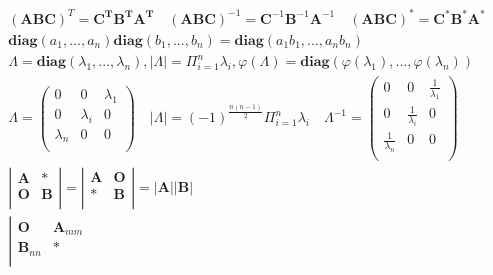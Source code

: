 \documentclass{article}
\begin{document}
\begin{align*}
    (\mathbf{A}\mathbf{B}\mathbf{C})^{T} = \mathbf{C}^{\mathbf{T}}\mathbf{B}^{\mathbf{T}}\mathbf{A}^{\mathbf{T}} \quad (\mathbf{A}\mathbf{B}\mathbf{C})^{-1} = \mathbf{C}^{-1}\mathbf{B}^{-1}\mathbf{A}^{-1} \quad (\mathbf{A}\mathbf{B}\mathbf{C})^{\mathbf{*}} = \mathbf{C}^{\mathbf{*}}\mathbf{B}^{\mathbf{*}}\mathbf{A}^{\mathbf{*}} \\ 
    \mathbf{diag}(a_{1},...,a_{n})\mathbf{diag}(b_{1},...,b_{n})=\mathbf{diag}(a_{1}b_{1},...,a_{n}b_{n}) \\ 
    \Lambda = \mathbf{diag}(\lambda_{1},...,\lambda_{n}),|\Lambda| = \Pi_{i=1}^{n} \lambda_{i},\varphi(\Lambda) = \mathbf{diag}(\varphi(\lambda_{1}),...,\varphi(\lambda_{n}))\\
    \Lambda = \left(
        \begin{array}{cccc}
            0 & 0 & \lambda_{1}\\
            0 & \lambda_{i} & 0 \\
            \lambda_{n} & 0 & 0\\
        \end{array}
    \right) \quad 
    |\Lambda| = (-1)^{\frac{n(n-1)}{2}}\Pi_{i=1}^{n}\lambda_{i} \quad \Lambda^{-1} = \left(
        \begin{array}{cccc}
            0 & 0 & \frac{1}{\lambda_{1}}\\
            0 & \frac{1}{\lambda_{i}} & 0 \\
            \frac{1}{\lambda_{n}} & 0 & 0\\
        \end{array}
    \right) \\ 
    \left|
        \begin{array}{ccc}
            \mathbf{A} & * \\ 
            \mathbf{O} & \mathbf{B} \\ 
        \end{array} 
    \right| = 
    \left|
        \begin{array}{ccc}
            \mathbf{A} & \mathbf{O} \\ 
            \mathbf{*} & \mathbf{B} \\ 
        \end{array} 
    \right| = |\mathbf{A}||\mathbf{B}|\\ 
    \left|
        \begin{array}{ccc}
            \mathbf{O} & \mathbf{A}_{mm} \\ 
            \mathbf{B}_{nn} & \mathbf{*} \\ 
        \end{array} 

\end{align*}
\end{document}
